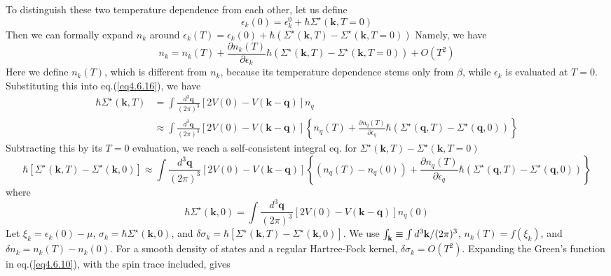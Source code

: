 To distinguish these two temperature dependence from each other, let us define
\begin{equation}
\epsilon_k(0) = \epsilon_k^0+\hbar \Sigma^\star (\mathbf{k},T=0)
\end{equation}
Then we can formally expand $n_k$ around $\epsilon_k(T)=\epsilon_k(0)+\hbar( \Sigma^\star (\mathbf{k},T)-\Sigma^\star (\mathbf{k},T=0))$
Namely, we have
\begin{equation}
n_k=n_k(T) + \frac{\partial n_k(T)}{\partial \epsilon_k} \hbar ( \Sigma^\star (\mathbf{k},T)-\Sigma^\star (\mathbf{k},T=0))+O(T^2)
\end{equation}
Here we define $n_k(T)$, which is different from $n_k$, because its temperature dependence stems only from $\beta$, while $\epsilon_k$ is evaluated at $T=0$.
Substituting this into eq.(\ref{eq4.6.16}), we have
\begin{equation}
\begin{aligned}
\hbar \Sigma^\star (\mathbf{k},T)&=\int \frac{d^3 \mathbf{q}}{(2\pi)^3} [2V(0)-V(\mathbf{k}-\mathbf{q})] n_q\\
&\approx \int \frac{d^3 \mathbf{q}}{(2\pi)^3} [2V(0)-V(\mathbf{k}-\mathbf{q})]\left\{ n_q(T)+\frac{\partial n_q(T)}{\partial \epsilon_q} \hbar ( \Sigma^\star (\mathbf{q},T)-\Sigma^\star (\mathbf{q},0))\right\}
\end{aligned}
\end{equation}
Subtracting this by its $T=0$ evaluation, we reach a self-consistent integral eq. for $\Sigma^\star (\mathbf{k},T)-\Sigma^\star (\mathbf{k},T=0)$
\begin{equation}\label{eq4.6.21}
\hbar[\Sigma^\star (\mathbf{k},T)-\Sigma^\star (\mathbf{k},0)]\approx \int \frac{d^3 \mathbf{q}}{(2\pi)^3} [2V(0)-V(\mathbf{k}-\mathbf{q})]\left\{ (n_q(T)-n_q(0)) +\frac{\partial n_q(T)}{\partial \epsilon_q} \hbar ( \Sigma^\star (\mathbf{q},T)-\Sigma^\star (\mathbf{q},0))\right\}
\end{equation}
where
\begin{equation}
\hbar \Sigma ^\star (\mathbf{k},0)=\int \frac{d^3 \mathbf{q}}{(2\pi)^3} [2V(0)-V(\mathbf{k}-\mathbf{q})]n_q(0)
\end{equation}
Let $\xi_k=\epsilon_k(0)-\mu$, $\sigma_k=\hbar\Sigma^\star(\mathbf k,0)$, and
$\delta\sigma_k=\hbar[\Sigma^\star(\mathbf k,T)-\Sigma^\star(\mathbf k,0)]$.
We use $\int_{\bf k}\equiv\int d^3\mathbf k/(2\pi)^3$, $n_k(T)=f(\xi_k)$, and $\delta n_k=n_k(T)-n_k(0)$.
For a smooth density of states and a regular Hartree-Fock kernel, $\delta\sigma_k=O(T^2)$.
Expanding the Green's function in eq.(\ref{eq4.6.10}), with the spin trace included, gives
